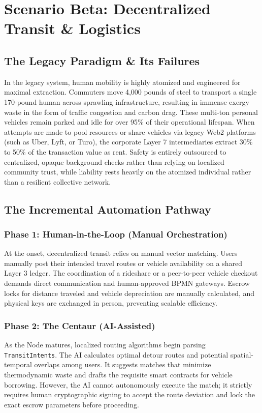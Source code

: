 \chapter{Scenario Beta: Decentralized Transit \& Logistics}

\section{The Legacy Paradigm \& Its Failures}
In the legacy system, human mobility is highly atomized and engineered for maximal extraction. Commuters move 4,000 pounds of steel to transport a single 170-pound human across sprawling infrastructure, resulting in immense exergy waste in the form of traffic congestion and carbon drag. These multi-ton personal vehicles remain parked and idle for over 95\% of their operational lifespan. When attempts are made to pool resources or share vehicles via legacy Web2 platforms (such as Uber, Lyft, or Turo), the corporate Layer 7 intermediaries extract 30\% to 50\% of the transaction value as rent. Safety is entirely outsourced to centralized, opaque background checks rather than relying on localized community trust, while liability rests heavily on the atomized individual rather than a resilient collective network.

\section{The Incremental Automation Pathway}

\subsection{Phase 1: Human-in-the-Loop (Manual Orchestration)}
At the onset, decentralized transit relies on manual vector matching. Users manually post their intended travel routes or vehicle availability on a shared Layer 3 ledger. The coordination of a rideshare or a peer-to-peer vehicle checkout demands direct communication and human-approved BPMN gateways. Escrow locks for distance traveled and vehicle depreciation are manually calculated, and physical keys are exchanged in person, preventing scalable efficiency.

\subsection{Phase 2: The Centaur (AI-Assisted)}
As the Node matures, localized routing algorithms begin parsing \texttt{TransitIntents}. The AI calculates optimal detour routes and potential spatial-temporal overlaps among users. It suggests matches that minimize thermodynamic waste and drafts the requisite smart contracts for vehicle borrowing. However, the AI cannot autonomously execute the match; it strictly requires human cryptographic signing to accept the route deviation and lock the exact escrow parameters before proceeding.

